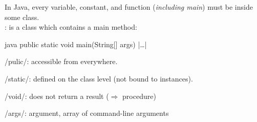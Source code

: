 \begin{sectionbox}\nospacing
  In Java, every variable, constant, and function (\textit{including main}) must
  be inside some class.\\
  : is a class which contains a main method:
  \begin{mintlinebox}{java}
		public static void main(String[] args) { |\ldots| }
  \end{mintlinebox}
  \begin{itemizenosep}
      \item \javainline/pulic/: accessible from everywhere.
      \item \javainline/static/: defined on the class level (not bound to instances).
      \item \javainline/void/: does not return a result ($\Rightarrow$ procedure)
      \item \javainline/args/: argument, array of command-line arguments
  \end{itemizenosep}
\end{sectionbox}
